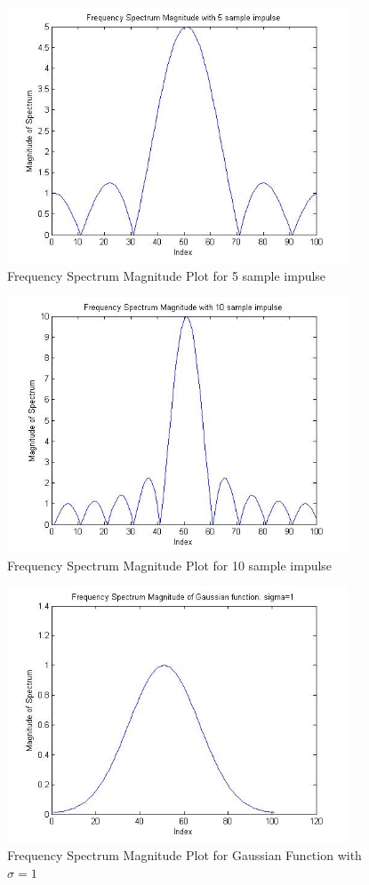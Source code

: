 \documentclass[11pt,psfig]{article}
\begin{document}
\begin{figure}[H]
\centering
\includegraphics[height=3in]{prob6plot_freq5.jpg}
\caption{Frequency Spectrum Magnitude Plot for 5 sample impulse}
\end{figure}

\begin{figure}[H]
\centering
\includegraphics[height=3in]{prob6plot_freq10.jpg}
\caption{Frequency Spectrum Magnitude Plot for 10 sample impulse}
\end{figure}

\begin{figure}[H]
\centering
\includegraphics[height=3in]{prob6plot_freqGauss1.jpg}
\caption{Frequency Spectrum Magnitude Plot for Gaussian Function with $\sigma=1$}
\end{figure}
\end{document}

